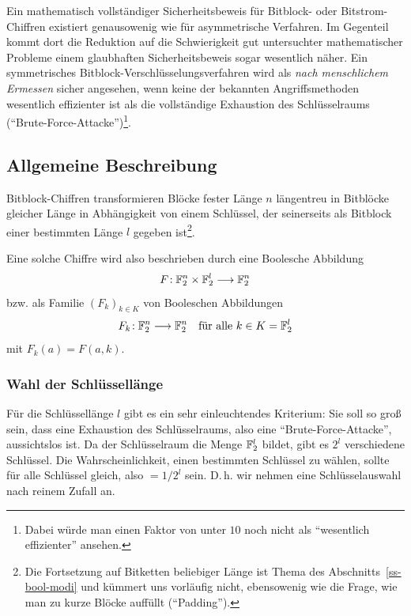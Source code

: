 \begin{refsegment}
Ein mathematisch vollständiger Sicherheitsbeweis für Bitblock- oder
Bitstrom-Chiffren
existiert genausowenig wie für asymmetrische Verfahren. Im Gegenteil
kommt dort die Reduktion auf die Schwierigkeit gut untersuchter
mathematischer Probleme einem glaubhaften Sicherheitsbeweis sogar
wesentlich näher. Ein symmetrisches Bitblock-Verschlüsselungsverfahren
wird als {\em nach menschlichem Ermessen} sicher angesehen, wenn keine
der bekannten Angriffsmethoden wesentlich effizienter ist als die
vollständige Exhaustion des Schlüsselraums
("`Brute-Force-Attacke"')\footnote{%
  Dabei würde man einen Faktor von unter $10$ noch nicht als
  "`wesentlich effizienter"' ansehen.
}.

\subsection{Allgemeine Beschreibung}\label{ss-bool-bbdesc}

Bitblock-Chiffren transformieren Blöcke fester Länge $n$ längentreu
in Bitblöcke gleicher Länge in Abhängigkeit von einem Schlüssel, der
seinerseits als Bitblock einer bestimmten Länge $l$ gegeben ist\footnote{%
  Die Fortsetzung auf Bitketten beliebiger Länge ist Thema des
  Abschnitts~\ref{ss-bool-modi} und kümmert uns vorläufig nicht, ebensowenig
  wie die Frage, wie man zu kurze Blöcke auffüllt ("`Padding"').
}.

Eine solche Chiffre wird also beschrieben durch eine Boolesche
Abbildung
\[
    F\!: \mathbb{F}_2^n \times \mathbb{F}_2^l \longrightarrow \mathbb{F}_2^n
\]
bzw. als Familie $(F_k)_{k \in K}$ von Booleschen Abbildungen
\[
    F_k\!: \mathbb{F}_2^n \longrightarrow \mathbb{F}_2^n \quad \text{für alle } k \in K = \mathbb{F}_2^l
\]
mit $F_k(a) = F(a,k)$.

\subsubsection*{Wahl der Schlüssellänge}

Für die Schlüssellänge $l$ gibt es ein
sehr einleuchtendes Kriterium: Sie soll so groß sein, dass eine
Exhaustion des Schlüsselraums, also
eine "`Brute-Force-Attacke"', aussichtslos ist.
Da der Schlüsselraum
die Menge $\mathbb{F}_2^l$ bildet, gibt es $2^l$ verschiedene Schlüssel. Die
Wahrscheinlichkeit, einen bestimmten Schlüssel zu wählen, sollte für
alle Schlüssel gleich, also $= 1/2^l$ sein. D.\,h. wir nehmen eine
Schlüsselauswahl nach reinem Zufall an.


\end{refsegment}
